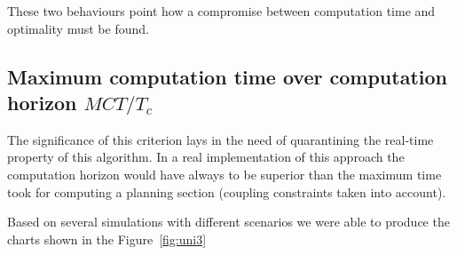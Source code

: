 \documentclass[eprint]{actapoly}
\begin{document}
These two behaviours point how a compromise between computation time and optimality must be found.


\subsection{Maximum computation time over computation horizon $MCT/T_c$}

The significance of this criterion lays in the need of quarantining the 
real-time property of this algorithm.
In a real implementation of this approach the computation horizon would have 
always to be superior than the
maximum time took for computing a planning section (coupling constraints
taken into account).

Based on several simulations with different scenarios we were able to
produce the charts shown in the Figure~\ref{fig:uni3}
\end{document}
